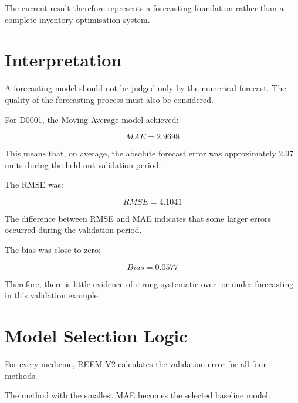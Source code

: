 \documentclass[11pt,a4paper]{article}
\begin{document}
The current result therefore represents a forecasting foundation rather than
a complete inventory optimisation system.

\section{Interpretation}

A forecasting model should not be judged only by the numerical forecast.
The quality of the forecasting process must also be considered.

For D0001, the Moving Average model achieved:

\[
MAE=2.9698
\]

This means that, on average, the absolute forecast error was approximately
2.97 units during the held-out validation period.

The RMSE was:

\[
RMSE=4.1041
\]

The difference between RMSE and MAE indicates that some larger errors
occurred during the validation period.

The bias was close to zero:

\[
Bias=0.0577
\]

Therefore, there is little evidence of strong systematic over- or
under-forecasting in this validation example.

\section{Model Selection Logic}

For every medicine, REEM V2 calculates the validation error for all four
methods.

The method with the smallest MAE becomes the selected baseline model.

\begin{center}
\end{center}
\end{document}
